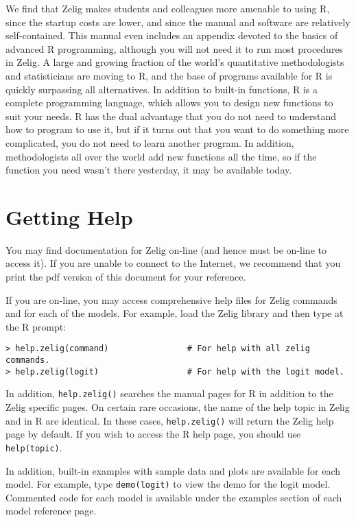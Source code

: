 We find that Zelig makes students and colleagues more amenable to
using R, since the startup costs are lower, and since the manual and
software are relatively self-contained.  This manual even includes an
appendix devoted to the basics of advanced R programming, although you
will not need it to run most procedures in Zelig.  A large and growing
fraction of the world's quantitative methodologists and statisticians
are moving to R, and the base of programs available for R is quickly
surpassing all alternatives.  In addition to built-in functions, R is
a complete programming language, which allows you to design new
functions to suit your needs.  R has the dual advantage that you do
not need to understand how to program to use it, but if it turns out
that you want to do something more complicated, you do not need to
learn another program.  In addition, methodologists all over the world
add new functions all the time, so if the function you need wasn't
there yesterday, it may be available today.

\section{Getting Help}

You may find documentation for Zelig on-line (and hence must be
on-line to access it).  If you are unable to connect to the Internet,
we recommend that you print the pdf version of this document for your
reference.

If you are on-line, you may access comprehensive help files for Zelig
commands and for each of the models.  For example, load the Zelig
library and then type at the R prompt:
\begin{verbatim}
> help.zelig(command)                # For help with all zelig commands.
> help.zelig(logit)                  # For help with the logit model.  
\end{verbatim}
\label{Rhelp}In addition, {\tt help.zelig()} searches the manual pages 
for R in addition to the Zelig specific pages.  On certain rare
occasions, the name of the help topic in Zelig and in R are identical.
In these cases, {\tt help.zelig()} will return the Zelig help page by
default.  If you wish to access the R help page, you should use {\tt
  help(topic)}.

In addition, built-in examples with sample data and plots are
available for each model.  For example, type {\tt demo(logit)} to view
the demo for the logit model.  Commented code for each model is
available under the examples section of each model reference page.

